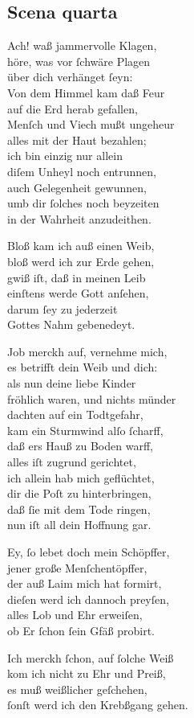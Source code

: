 \documentclass{ees}
\newenvironment{lyrics}[1]{%
  \subsection{#1}\nopagebreak%
  \begin{lyricslist}%
  \let\voice\item%
}{%
  \end{lyricslist}%
}
\begin{document}
\begin{lyrics}{Scena quarta}
  \voice[Leviathan]
  Ach! waß jammervolle Klagen,\\
  höre, was vor ſchwäre Plagen\\
  über dich verhänget ſeyn:\\
  Von dem Himmel kam daß Feur\\
  auf die Erd herab gefallen,\\
  Menſch und Viech mußt ungeheur\\
  alles mit der Haut bezahlen;\\
  ich bin einzig nur allein\\
  diſem Unheyl noch entrunnen,\\
  auch Gelegenheit gewunnen,\\
  umb dir ſolches noch beyzeiten\\
  in der Wahrheit anzudeithen.

  \voice[Job]\enlargethispage\baselineskip
  Bloß kam ich auß einen Weib,\\
  bloß werd ich zur Erde gehen,\\
  gwiß iſt, daß in meinen Leib\\
  einſtens werde Gott anſehen,\\
  darum ſey zu jederzeit\\
  Gottes Nahm gebenedeyt.

  \voice[Leviathan]
  Job merckh auf, vernehme mich,\\
  es betrifft dein Weib und dich:\\
  als nun deine liebe Kinder\\
  fröhlich waren, und nichts münder\\
  dachten auf ein Todtgefahr,\\
  kam ein Sturmwind alſo ſcharff,\\
  daß ers Hauß zu Boden warff,\\
  alles iſt zugrund gerichtet,\\
  ich allein hab mich geflüchtet,\\
  dir die Poſt zu hinterbringen,\\
  daß ſie mit dem Tode ringen,\\
  nun iſt all dein Hoffnung gar.

  \voice[Job]
  Ey, ſo lebet doch mein Schöpffer,\\
  jener große Menſchentöpffer,\\
  der auß Laim mich hat formirt,\\
  dieſen werd ich dannoch preyſen,\\
  alles Lob und Ehr erweiſen,\\
  ob Er ſchon ſein Gfäß probirt.

  \voice[Leviathan]
  Ich merckh ſchon, auf ſolche Weiß\\
  kom ich nicht zu Ehr und Preiß,\\
  es muß weißlicher geſchehen,\\
  ſonſt werd ich den Krebßgang gehen.
\end{lyrics}
\end{document}
